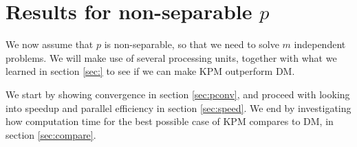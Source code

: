 \chapter{Results for non-separable $p$} \label{sec:para}%

We now assume that $p$ is non-separable, so that we need to solve $m$ independent problems. We will make use of several processing units, together with what we learned in section \ref{sec:} to see if we can make KPM outperform DM.

We start by showing convergence in section \ref{sec:pconv}, and proceed with looking into speedup and parallel efficiency in section \ref{sec:speed}. We end by investigating how computation time for the best possible case of KPM compares to DM, in section \ref{sec:compare}. 


